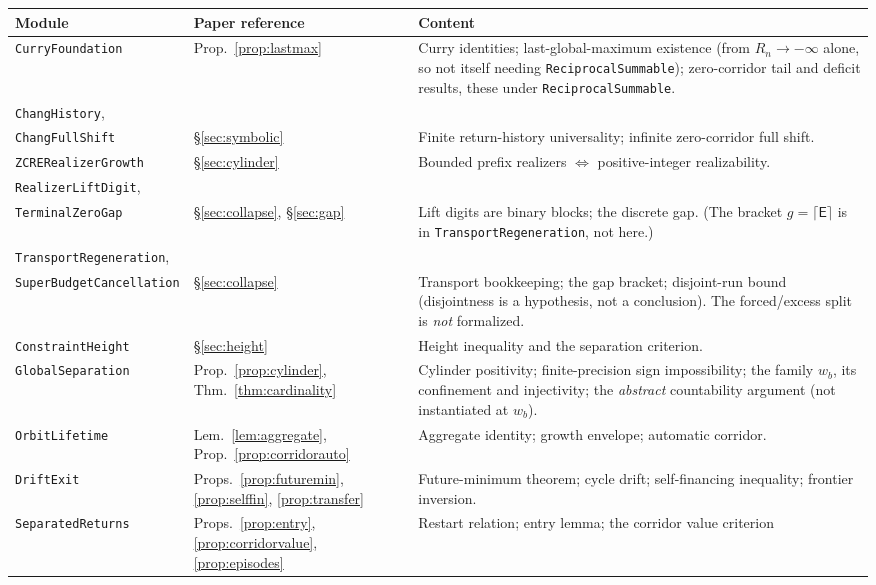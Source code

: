 \documentclass[11pt]{article}
\theoremstyle{plain}
\theoremstyle{definition}
\theoremstyle{remark}
\newcommand{\Edep}{\mathsf{E}}          %
\begin{document}
\begin{center}
\small
\begin{tabular}{@{}p{}p{}p{}@{}}
\toprule
Module & Paper reference & Content \\
\midrule
\texttt{CurryFoundation} & Prop.~\ref{prop:lastmax} & Curry identities; last-global-maximum
existence (from $R_n\to-\infty$ alone, so not itself needing \texttt{ReciprocalSummable});
zero-corridor tail and deficit results, these under
\texttt{ReciprocalSummable}. \\
\texttt{ChangHistory},\\ \texttt{ChangFullShift} & \S\ref{sec:symbolic} & Finite return-history
universality; infinite zero-corridor full shift. \\
\texttt{ZCRERealizerGrowth} & \S\ref{sec:cylinder} & Bounded prefix realizers $\iff$
positive-integer realizability. \\
\texttt{RealizerLiftDigit},\\ \texttt{TerminalZeroGap} & \S\ref{sec:collapse}, \S\ref{sec:gap} &
Lift digits are binary blocks; the discrete gap. (The bracket $g=\lceil\Edep\rceil$ is in
\texttt{TransportRegeneration}, not here.) \\
\texttt{TransportRegen\-eration},\\ \texttt{SuperBudgetCan\-cellation} & \S\ref{sec:collapse} &
Transport bookkeeping; the gap bracket; disjoint-run bound (disjointness is a hypothesis, not a
conclusion). The forced/excess split is \emph{not} formalized. \\
\texttt{ConstraintHeight} & \S\ref{sec:height} & Height inequality and the separation criterion. \\
\texttt{GlobalSeparation} & Prop.~\ref{prop:cylinder}, Thm.~\ref{thm:cardinality} & Cylinder
positivity; finite-precision sign impossibility; the family $w_b$, its confinement and
injectivity; the \emph{abstract} countability argument (not instantiated at $w_b$). \\
\texttt{OrbitLifetime} & Lem.~\ref{lem:aggregate}, Prop.~\ref{prop:corridorauto} & Aggregate
identity; growth envelope; automatic corridor. \\
\texttt{DriftExit} & Props.~\ref{prop:futuremin}, \ref{prop:selffin}, \ref{prop:transfer} &
Future-minimum theorem; cycle drift; self-financing inequality; frontier inversion. \\
\texttt{SeparatedReturns} & Props.~\ref{prop:entry}, \ref{prop:corridorvalue},
\ref{prop:episodes} & Restart relation; entry lemma; the corridor value criterion

\end{tabular}
\end{center}
\end{document}
